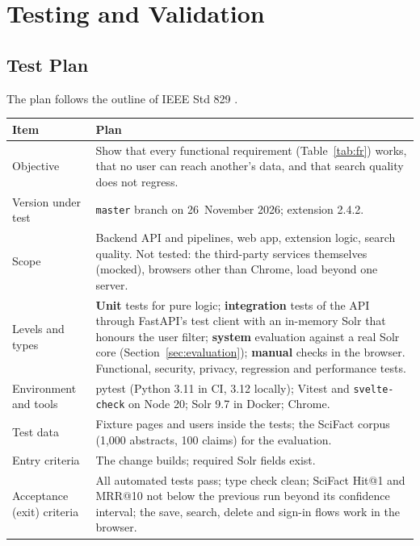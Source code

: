 
\chapter{Testing and Validation}
\label{ch:testing}

\section{Test Plan}

The plan follows the outline of IEEE Std 829 \cite{pressman2014se}.

\begin{table}[H]
\centering
\footnotesize
\begin{tabularx}{\textwidth}{>{\raggedright\arraybackslash}p{} L}
\toprule
\textbf{Item} & \textbf{Plan} \\
\midrule
Objective & Show that every functional requirement (Table~\ref{tab:fr}) works, that no user can reach another's data, and that search quality does not regress. \\
Version under test & \texttt{master} branch on 26~November 2026; extension 2.4.2. \\
Scope & Backend API and pipelines, web app, extension logic, search quality. Not tested: the third-party services themselves (mocked), browsers other than Chrome, load beyond one server. \\
Levels and types & \textbf{Unit} tests for pure logic; \textbf{integration} tests of the API through FastAPI's test client with an in-memory Solr that honours the user filter; \textbf{system} evaluation against a real Solr core (Section~\ref{sec:evaluation}); \textbf{manual} checks in the browser. Functional, security, privacy, regression and performance tests. \\
Environment and tools & pytest (Python 3.11 in CI, 3.12 locally); Vitest and \texttt{svelte-check} on Node 20; Solr 9.7 in Docker; Chrome. \\
Test data & Fixture pages and users inside the tests; the SciFact corpus (1{,}000 abstracts, 100 claims) for the evaluation. \\
Entry criteria & The change builds; required Solr fields exist. \\
Acceptance (exit) criteria & All automated tests pass; type check clean; SciFact Hit@1 and MRR@10 not below the previous run beyond its confidence interval; the save, search, delete and sign-in flows work in the browser. \\

\end{tabularx}
\end{table}
